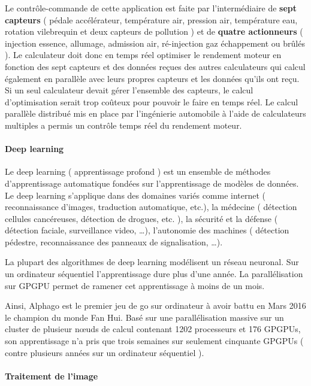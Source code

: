 \documentclass[fleqn,11pt]{article}
\begin{document}
Le contrôle-commande de cette application est faite par l'intermédiaire de \textbf{sept capteurs} ( pédale accélérateur,  température air, pression air, température eau, rotation vilebrequin et deux capteurs de pollution ) et de \textbf{quatre actionneurs} ( injection essence, allumage, admission air, ré-injection gaz échappement ou brûlés ). Le calculateur doit donc en temps réel optimiser le rendement moteur en fonction des sept capteurs et des données reçues des autres calculateurs qui calcul également en parallèle avec leurs propres capteurs et les données qu'ils ont reçu. Si un seul calculateur devait gérer l'ensemble des capteurs, le calcul d'optimisation serait trop coûteux pour pouvoir le faire en temps réel. Le calcul parallèle distribué mis en place par l'ingénierie automobile à l'aide de calculateurs multiples a permis un contrôle temps réel du rendement moteur. 

\paragraph{Deep learning}

Le deep learning ( apprentissage profond ) est un ensemble de méthodes d'apprentissage automatique fondées sur l'apprentissage de modèles de données. Le deep learning s'applique dans des domaines variés  comme internet ( reconnaissance d'images, traduction automatique, etc.), la médecine  ( détection cellules cancéreuses, détection de drogues, etc. ), la sécurité et la défense  ( détection faciale, surveillance video, \ldots ), l'autonomie des machines ( détection pédestre,  reconnaissance des panneaux de signalisation, \ldots ).

La plupart des algorithmes de deep learning modélisent un réseau neuronal. Sur un ordinateur séquentiel l'apprentissage dure plus d'une année. La parallélisation sur GPGPU permet de ramener cet apprentissage  à moins de un mois.

Ainsi, Alphago est le premier jeu de go sur ordinateur à avoir battu en Mars 2016 le champion du monde Fan Hui. Basé sur une parallélisation massive sur un cluster de plusieur nœuds de calcul contenant 1202 processeurs et 176 GPGPUs, son apprentissage n'a pris que trois semaines sur seulement cinquante GPGPUs ( contre plusieurs années sur un ordinateur séquentiel ).



\paragraph{Traitement de l'image}
\end{document}
